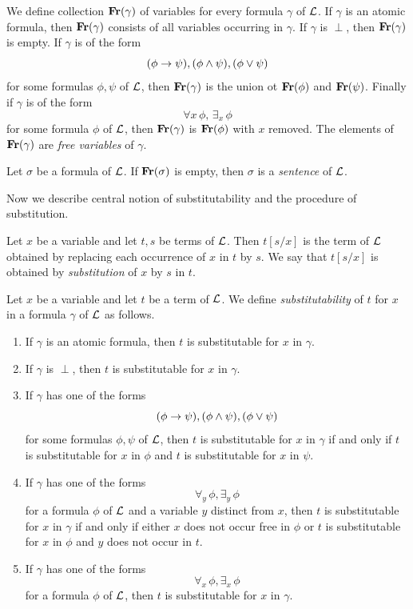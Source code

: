 \documentclass[10pt]{amsart}
\begin{document}
\begin{definition}
	We define collection $\mathbf{Fr}(\gamma)$ of variables for every formula $\gamma$ of ${\mathcal L}$. If $\gamma$ is an atomic formula, then $\mathbf{Fr}(\gamma)$ consists of all variables occurring in $\gamma$. If $\gamma$ is $\perp$, then $\mathbf{Fr}(\gamma)$ is empty. If $\gamma$ is of the form
	$$(\phi \rightarrow \psi),(\phi \wedge \psi),(\phi \vee \psi)$$
	for some formulas $\phi,\psi$ of ${\mathcal L}$, then $\mathbf{Fr}(\gamma)$ is the union ot $\mathbf{Fr}(\phi)$ and $\mathbf{Fr}(\psi)$. Finally if $\gamma$ is of the form
	$$\forall x\,\phi,\,\exists_x\,\phi$$
	for some formula $\phi$ of ${\mathcal L}$, then $\mathbf{Fr}(\gamma)$ is $\mathbf{Fr}(\phi)$ with $x$ removed. The elements of $\mathbf{Fr}(\gamma)$ are \textit{free variables} of $\gamma$.
\end{definition}

\begin{definition}
	Let $\sigma$ be a formula of ${\mathcal L}$. If $\mathbf{Fr}(\sigma)$ is empty, then $\sigma$ is a \textit{sentence} of ${\mathcal L}$.
\end{definition}
\noindent
Now we describe central notion of substitutability and the procedure of substitution.

\begin{definition}
	Let $x$ be a variable and let $t,s$ be terms of ${\mathcal L}$. Then $t[s/x]$ is the term of ${\mathcal L}$ obtained by replacing each occurrence of $x$ in $t$ by $s$. We say that $t[s/x]$ is obtained by \textit{substitution} of $x$ by $s$ in $t$.
\end{definition}

\begin{definition}
	Let $x$ be a variable and let $t$ be a term of ${\mathcal L}$. We define \textit{substitutability} of $t$ for $x$ in a formula $\gamma$ of ${\mathcal L}$ as follows.
	\begin{enumerate}[label=\textbf{(\arabic*)}, leftmargin=3.0em]
		\item If $\gamma$ is an atomic formula, then $t$ is substitutable for $x$ in $\gamma$.
		\item If $\gamma$ is $\perp$, then $t$ is substitutable for $x$ in $\gamma$.
		\item If $\gamma$ has one of the forms
		      $$(\phi \rightarrow  \psi),(\phi \wedge \psi),(\phi \vee \psi)$$
		      for some formulas $\phi,\psi$ of ${\mathcal L}$, then $t$ is substitutable for $x$ in $\gamma$ if and only if $t$ is substitutable for $x$ in $\phi$ and $t$ is substitutable for $x$ in $\psi$.
		\item If $\gamma$ has one of the forms
		      $$\forall_y\,\phi,\exists_y\,\phi$$
		      for a formula $\phi$ of ${\mathcal L}$ and a variable $y$ distinct from $x$, then $t$ is substitutable for $x$ in $\gamma$ if and only if either $x$ does not occur free in $\phi$ or $t$ is substitutable for $x$ in $\phi$ and $y$ does not occur in $t$.
		\item If $\gamma$ has one of the forms
		      $$\forall_x\,\phi,\exists_x\,\phi$$
		      for a formula $\phi$ of ${\mathcal L}$, then $t$ is substitutable for $x$ in $\gamma$.
	\end{enumerate}
\end{definition}
\end{document}

